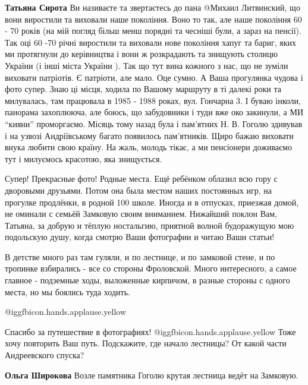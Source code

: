 \begin{itemize}
\begin{itemize}
\textbf{Татьяна Сирота} Ви називаєте та звертаєтесь до пана @Михаил Литвинский, що вони виростили та виховали наше покоління.
Воно то так, але наше покоління 60 - 70 років (на мій погляд більш менш порядні та чесніші були, а зараз на пенсії).
Так оці 60 -70 річні виростили та виховали нове покоління хапуг та бариг, яких ми протягнули до керівництва і вони ж розкрадають та знищують столицю України (і інші міста України ).
Так що тут вина кожного з нас, що не зуміли виховати патріотів.
Є патріоти, але мало.
Оце сумно.
А Ваша прогулянка чудова і фото супер.
Знаю ці місця, ходила по Вашому маршруту в ті далекі роки та милувалась, там працювала в 1985 - 1988 роках, вул. Гончарна 3.
І буваю інколи, панорама захоплююча, але боюсь, що забудовники і туди вже око закинули, а МИ \enquote{кияни} проморгаємо.
Місяць тому назад була і пам'ятних Н. В. Гоголю здивував і на узвозі Андріївському багато появилось пам'ятників.
Щиро бажаю виховати внука любити свою країну.
На жаль, молодь тікає, а ми пенсіонери доживаємо тут і милуємось красотою, яка знищується.
\end{itemize} %


Супер! Прекрасные фото! Родные места. Ещё ребёнком облазил всю гору с дворовыми
друзьями. Потом она была местом наших постоянных игр, на прогулке продлёнки, в
родной 100 школе. Иногда и в отпусках, приезжая домой, не оминали с семьёй
Замковую своим вниманием. Нижайший поклон Вам, Татьяна, за добрую и тёплую
ностальгию, приятной волной будоражущую мою подольскую душу, когда смотрю Ваши
фотографии и читаю Ваши статьи!


В детстве много раз там гуляли, и по лестнице, и по замковой стене, и по
тропинке взбирались - все со стороны Фроловской. Много интересного, а самое
главное - подземные ходы, выложенные кирпичом, в разные стороны с одного
места, но мы боялись туда ходить.

 @igg{fbicon.hands.applause.yellow} 


Спасибо за путешествие в фотографиях! @igg{fbicon.hands.applause.yellow}  Тоже хочу повторить Ваш путь.
Подскажите, где начало лестницы? От какой части Андреевского спуска?

\begin{itemize} %
\textbf{Ольга Широкова} Возле памятника Гоголю крутая лестница ведёт на Замковую.


\end{itemize}
\end{itemize}
